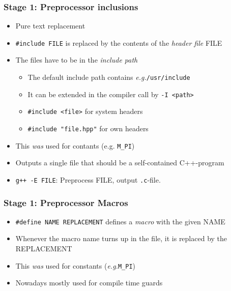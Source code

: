 \documentclass{slides}
\newcommand{\eg}{\textit{e.\thinspace g.}\xspace}
\begin{document}
\begin{frame}[fragile]
  \frametitle{Stage 1: Preprocessor inclusions}

    \begin{itemize}
    \item Pure text replacement
    \item \lstinline!#include FILE! is replaced by the contents of the
      \emph{header file} FILE
    \item The files have to be in the \emph{include path}
      \begin{itemize}
      \item The default include path contains \eg \texttt{/usr/include}
      \item It can be extended in the compiler call by \texttt{-I
          <path>}
      \item \lstinline!#include <file>! for system headers
      \item \lstinline!#include "file.hpp"! for own headers
      \end{itemize}
    \item This \emph{was} used for contants (e.g. \lstinline!M_PI!)
    \item Outputs a single file that should be a self-contained
      C++-program
    \item \lstinline!g++ -E FILE!: Preprocess FILE, output
      \lstinline!.c!-file.
    \end{itemize}
\end{frame}

\begin{frame}[fragile]
  \frametitle{Stage 1: Preprocessor Macros}
    \begin{itemize}
    \item \lstinline!#define NAME REPLACEMENT! defines a
      \emph{macro} with the given NAME
    \item Whenever the macro name turns up in the file, it is replaced
      by the REPLACEMENT
    \item This \emph{was} used for constants (\eg \lstinline!M_PI!)
    \item Nowadays mostly used for compile time guards
    \end{itemize}
\end{frame}
\end{document}
